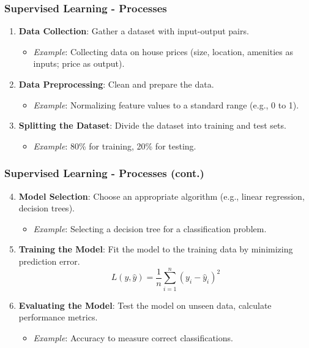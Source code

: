 \documentclass[aspectratio=169]{beamer}
\begin{document}
\begin{frame}[fragile]
    \frametitle{Supervised Learning - Processes}
    \begin{enumerate}
        \item \textbf{Data Collection}: Gather a dataset with input-output pairs.
            \begin{itemize}
                \item \textit{Example}: Collecting data on house prices (size, location, amenities as inputs; price as output).
            \end{itemize}
        \item \textbf{Data Preprocessing}: Clean and prepare the data.
            \begin{itemize}
                \item \textit{Example}: Normalizing feature values to a standard range (e.g., 0 to 1).
            \end{itemize}
        \item \textbf{Splitting the Dataset}: Divide the dataset into training and test sets.
            \begin{itemize}
                \item \textit{Example}: 80\% for training, 20\% for testing.
            \end{itemize}
    \end{enumerate}
\end{frame}

\begin{frame}[fragile]
    \frametitle{Supervised Learning - Processes (cont.)}
    \begin{enumerate}
        \setcounter{enumi}{3}
        \item \textbf{Model Selection}: Choose an appropriate algorithm (e.g., linear regression, decision trees).
            \begin{itemize}
                \item \textit{Example}: Selecting a decision tree for a classification problem.
            \end{itemize}
        \item \textbf{Training the Model}: Fit the model to the training data by minimizing prediction error.
            \begin{equation}
                L(y, \hat{y}) = \frac{1}{n} \sum_{i=1}^{n} (y_i - \hat{y}_i)^2
            \end{equation}
        \item \textbf{Evaluating the Model}: Test the model on unseen data, calculate performance metrics.
            \begin{itemize}
                \item \textit{Example}: Accuracy to measure correct classifications.
            \end{itemize}
    \end{enumerate}
\end{frame}
\end{document}
